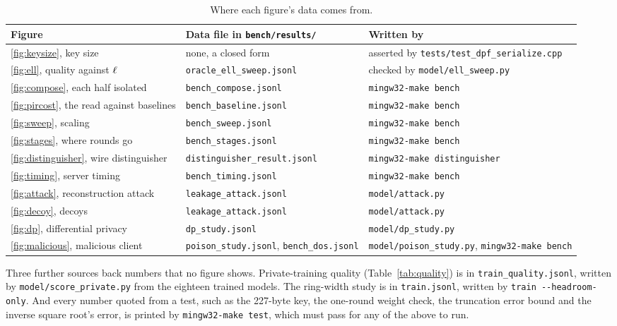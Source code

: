 \begin{table}[h]
\centering
\footnotesize
\caption{Where each figure's data comes from.}
\label{tab:reproduce}
\begin{tabular}{@{}>{\raggedright\arraybackslash}p{4.3cm}
                >{\raggedright\arraybackslash}p{4.6cm}
                >{\raggedright\arraybackslash}p{5.6cm}@{}}
\toprule
Figure & Data file in \texttt{bench/results/} & Written by \\
\midrule
\ref{fig:keysize}, key size & none, a closed form & asserted by
  \texttt{tests/test\_dpf\_serialize.cpp} \\
\ref{fig:ell}, quality against $\ell$ & \texttt{oracle\_ell\_sweep.jsonl} &
  checked by \texttt{model/ell\_sweep.py} \\
\ref{fig:compose}, each half isolated & \texttt{bench\_compose.jsonl} &
  \texttt{mingw32-make bench} \\
\ref{fig:pircost}, the read against baselines & \texttt{bench\_baseline.jsonl} &
  \texttt{mingw32-make bench} \\
\ref{fig:sweep}, scaling & \texttt{bench\_sweep.jsonl} &
  \texttt{mingw32-make bench} \\
\ref{fig:stages}, where rounds go & \texttt{bench\_stages.jsonl} &
  \texttt{mingw32-make bench} \\
\ref{fig:distinguisher}, wire distinguisher & \texttt{distinguisher\_result.jsonl}
  & \texttt{mingw32-make distinguisher} \\
\ref{fig:timing}, server timing & \texttt{bench\_timing.jsonl} &
  \texttt{mingw32-make bench} \\
\ref{fig:attack}, reconstruction attack & \texttt{leakage\_attack.jsonl} &
  \texttt{model/attack.py} \\
\ref{fig:decoy}, decoys & \texttt{leakage\_attack.jsonl} &
  \texttt{model/attack.py} \\
\ref{fig:dp}, differential privacy & \texttt{dp\_study.jsonl} &
  \texttt{model/dp\_study.py} \\
\ref{fig:malicious}, malicious client & \texttt{poison\_study.jsonl},
  \texttt{bench\_dos.jsonl} & \texttt{model/poison\_study.py},
  \texttt{mingw32-make bench} \\
\bottomrule
\end{tabular}
\end{table}

Three further sources back numbers that no figure shows. Private-training
quality (Table~\ref{tab:quality}) is in \texttt{train\_quality.jsonl}, written by
\texttt{model/score\_private.py} from the eighteen trained models. The
ring-width study is in \texttt{train.jsonl}, written by \texttt{train
-{}-headroom-only}. And every number quoted from a test, such as the 227-byte key,
the one-round weight check, the truncation error bound and the inverse
square root's error, is printed by \texttt{mingw32-make test}, which must pass
for any of the above to run.


